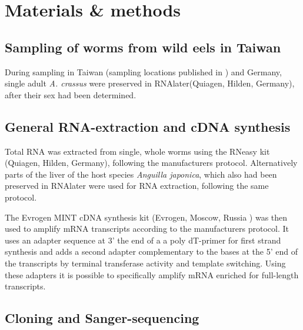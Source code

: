 

\chapter{Materials \& methods} %



\ifpdf
    \graphicspath{{8/figures/PNG/}{8/figures/PDF/}{8/figures/}}
\else
    \graphicspath{{8/figures/EPS/}{8/figures/}}
\fi



\section{Sampling of worms from  wild eels in Taiwan}

During sampling in Taiwan (sampling locations published in
\cite{heitlinger_massive_2009}) and Germany, single adult
\textit{A. crassus} were preserved in RNAlater(Quiagen, Hilden,
Germany), after their sex had been determined. 


\section{General RNA-extraction and cDNA synthesis}

Total RNA was extracted from single, whole worms using the RNeasy kit
(Quiagen, Hilden, Germany), following the manufacturers
protocol. Alternatively parts of the liver of the host species
\textit{Anguilla japonica}, which also had been preserved in RNAlater
were used for RNA extraction, following the same protocol.

The Evrogen MINT cDNA synthesis kit (Evrogen, Moscow, Russia ) was
then used to amplify mRNA transcripts according to the manufacturers
protocol. It uses an adapter sequence at 3' the end of a a poly
dT-primer for first strand synthesis and adds a second adapter
complementary to the bases at the 5' end of the transcripts by
terminal transferase activity and template switching. Using these
adapters it is possible to specifically amplify mRNA enriched for
full-length transcripts. 


\section{Cloning and Sanger-sequencing}

